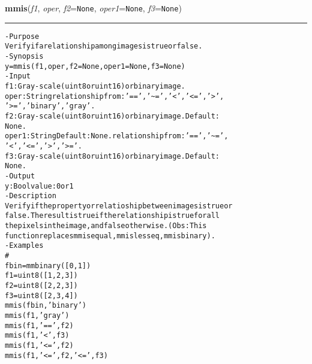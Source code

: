     \begin{boxedminipage}{\textwidth}

    \raggedright \textbf{mmis}(\textit{f1}, \textit{oper}, \textit{f2}=\texttt{N\-o\-n\-e\-}, \textit{oper1}=\texttt{N\-o\-n\-e\-}, \textit{f3}=\texttt{N\-o\-n\-e\-})

    \vspace{-1.5ex}

    \rule{\textwidth}{0.5\fboxrule}
\begin{alltt}
- Purpose
    Verify if a relationship among images is true or false.
- Synopsis
    y = mmis(f1, oper, f2=None, oper1=None, f3=None)
- Input
    f1:    Gray-scale (uint8 or uint16) or binary image.
    oper:  String relationship from: '==', '{\textasciitilde}=', '{\textless}','{\textless}=', '{\textgreater}',
           '{\textgreater}=', 'binary', 'gray'.
    f2:    Gray-scale (uint8 or uint16) or binary image. Default:
           None.
    oper1: String Default: None. relationship from: '==', '{\textasciitilde}=',
           '{\textless}','{\textless}=', '{\textgreater}', '{\textgreater}='.
    f3:    Gray-scale (uint8 or uint16) or binary image. Default:
           None.
- Output
    y: Bool value: 0 or 1
- Description
    Verify if the property or relatioship between images is true or
    false. The result is true if the relationship is true for all
    the pixels in the image, and false otherwise. (Obs: This
    function replaces mmis equal, mmis lesseq, mmis binary ).
- Examples
    \#
    fbin=mmbinary([0, 1])
    f1=uint8([1, 2, 3])
    f2=uint8([2, 2, 3])
    f3=uint8([2, 3, 4])
    mmis(fbin,'binary')
    mmis(f1,'gray')
    mmis(f1,'==',f2)
    mmis(f1,'{\textless}',f3)
    mmis(f1,'{\textless}=',f2)
    mmis(f1,'{\textless}=',f2,'{\textless}=',f3)\end{alltt}

    \vspace{1ex}

    \end{boxedminipage}

    \label{multireg:num_pymorph:mmisbinary}
    \vspace{0.5ex}

